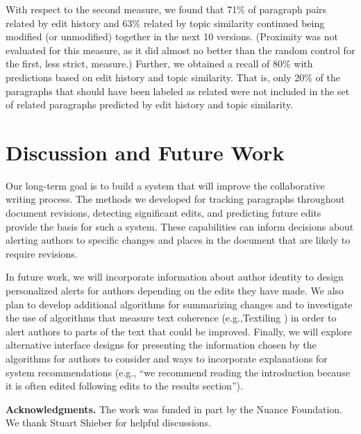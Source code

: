 With respect to the second measure, we found that 71\% of paragraph
pairs related by edit history and 63\% related by topic similarity
continued being modified (or unmodified) together in the next 10
versions. (Proximity was not evaluated for this measure, as it did
almost no better than the random control for the first, less strict,
measure.) Further, we obtained a recall of 80\% with predictions based
on edit history and topic similarity. That is, only 20\% of the
paragraphs that should have been labeled as related were not included in
the set of related paragraphs predicted by edit history and topic
similarity.

\section{Discussion and Future Work}\label{discussion-and-future-work}

Our long-term goal is to build a system that will improve the
collaborative writing process. The methods we developed for tracking
paragraphs throughout document revisions, detecting significant edits,
and predicting future edits provide the basis for such a system. These
capabilities can inform decisions about alerting authors to specific
changes and places in the document that are likely to require revisions.

In future work, we will incorporate information about author identity to
design personalized alerts for authors depending on the edits they have
made. We also plan to develop additional algorithms for summarizing
changes and to investigate the use of algorithms that measure text
coherence (e.g.,Textiling \cite{hearst1994multi}) in order to alert
authors to parts of the text that could be improved. Finally, we will
explore alternative interface designs for presenting the information
chosen by the algorithms for authors to consider and ways to incorporate
explanations for system recommendations (e.g., ``we recommend reading
the introduction because it is often edited following edits to the
results section'').

\textbf{Acknowledgments.} The work was funded in part by the Nuance
Foundation. We thank Stuart Shieber for helpful discussions.
